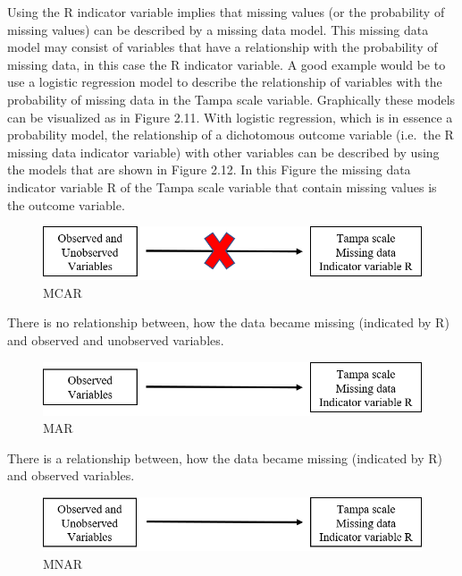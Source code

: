 \documentclass[]{book}
\theoremstyle{definition}
\theoremstyle{definition}
\theoremstyle{definition}
\theoremstyle{remark}
\begin{document}
Using the R indicator variable implies that missing values (or the
probability of missing values) can be described by a missing data model.
This missing data model may consist of variables that have a
relationship with the probability of missing data, in this case the R
indicator variable. A good example would be to use a logistic regression
model to describe the relationship of variables with the probability of
missing data in the Tampa scale variable. Graphically these models can
be visualized as in Figure 2.11. With logistic regression, which is in
essence a probability model, the relationship of a dichotomous outcome
variable (i.e.~the R missing data indicator variable) with other
variables can be described by using the models that are shown in Figure
2.12. In this Figure the missing data indicator variable R of the Tampa
scale variable that contain missing values is the outcome variable.

\begin{figure}

{\centering \includegraphics[width=0.9\linewidth]{images/fig2.9a} 

}

\caption{MCAR}\label{fig:fig2-9a}
\end{figure}

There is no relationship between, how the data became missing (indicated
by R) and observed and unobserved variables.

\begin{figure}

{\centering \includegraphics[width=0.9\linewidth]{images/fig2.9b} 

}

\caption{MAR}\label{fig:fig2-9b}
\end{figure}

There is a relationship between, how the data became missing (indicated
by R) and observed variables.

\begin{figure}

{\centering \includegraphics[width=0.9\linewidth]{images/fig2.9c} 

}

\caption{MNAR}\label{fig:fig2-9c}
\end{figure}
\end{document}
